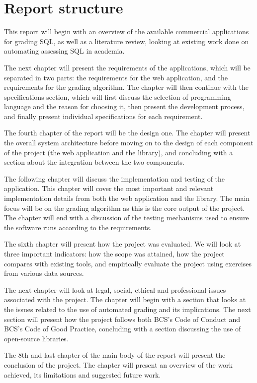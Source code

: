 \section{Report structure}

This report will begin with an overview of the available commercial applications for grading SQL, as well as a literature review, looking at existing work done on automating assessing SQL in academia.

The next chapter will present the requirements of the applications, which will be separated in two parts: the requirements for the web application, and the requirements for the grading algorithm. The chapter will then continue with the specifications section, which will first discuss the selection of programming language and the reason for choosing it, then present the development process, and finally present individual specifications for each requirement.

The fourth chapter of the report will be the design one. The chapter will present the overall system architecture before moving on to the design of each component of the project (the web application and the library), and concluding with a section about the integration between the two components.

The following chapter will discuss the implementation and testing of the application. This chapter will cover the most important and relevant implementation details from both the web application and the library. The main focus will be on the grading algorithm as this is the core output of the project. The chapter will end with a discussion of the testing mechanisms used to ensure the software runs according to the requirements.

The sixth chapter will present how the project was evaluated. We will look at three important indicators: how the scope was attained, how the project compares with existing tools, and empirically evaluate the project using exercises from various data sources.

The next chapter will look at legal, social, ethical and professional issues associated with the project. The chapter will begin with a section that looks at the issues related to the use of automated grading and its implications. The next section will present how the project follows both BCS's Code of Conduct and BCS's Code of Good Practice, concluding with a section discussing the use of open-source libraries.

The 8th and last chapter of the main body of the report will present the conclusion of the project. The chapter will present an overview of the work achieved, its limitations and suggested future work.